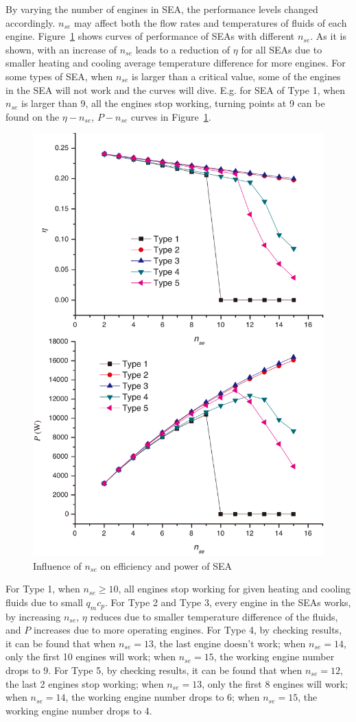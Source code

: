 By varying the number of engines in SEA, the performance levels changed accordingly. $n_{se}$ may affect both the flow rates and temperatures of fluids of each engine. Figure~\ref{fig:n_se} shows curves of performance of SEAs with different $n_{se}$. As it is shown, with an increase of $n_{se}$ leads to a reduction of $\eta$ for all SEAs due to smaller heating and cooling average temperature difference for more engines. For some types of SEA, when $n_{se}$ is larger than a critical value, some of the engines in the SEA will not work and the curves will dive. E.g. for SEA of Type 1, when $n_{se}$ is larger than 9, all the engines stop working, turning points at 9 can be found on the $\eta-n_{se}$, $P-n_{se}$ curves in Figure~\ref{fig:n_se}.

\noindent \begin{figure}[htbp]
\begin{center}
	\includegraphics[width = 0.7\columnwidth]{./fig/n_se}
	\caption{Influence of $n_{se}$ on efficiency and power of SEA}
	\label{fig:n_se}
\end{center}
\end{figure}

For Type 1, when $n_{se} \geqslant 10$, all engines stop working for given heating and cooling fluids due to small $q_mc_p$. For Type 2 and Type 3, every engine in the SEAs works, by increasing $n_{se}$, $\eta$ reduces due to smaller temperature difference of the fluids, and $P$ increases due to more operating engines. For Type 4, by checking results, it can be found that when $n_{se} = 13$,  the last engine doesn't work; when $n_{se} = 14$, only the first 10 engines will work; when $n_{se} = 15$, the working engine number drops to 9. For Type 5, by checking results, it can be found that when $n_{se} = 12$, the last 2 engines stop working; when $n_{se} = 13$, only the first 8 engines will work; when $n_{se} = 14$, the working engine number drops to 6; when $n_{se} = 15$, the working engine number drops to 4.

